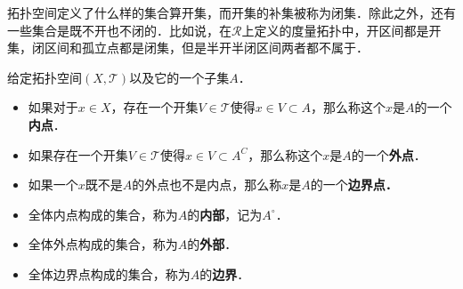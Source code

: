 
拓扑空间定义了什么样的集合算开集，而开集的补集被称为闭集．除此之外，还有一些集合是既不开也不闭的．比如说，在$\mathcal{R}$上定义的度量拓扑中，开区间都是开集，闭区间和孤立点都是闭集，但是半开半闭区间两者都不属于．

\begin{definition}{}
给定拓扑空间$(X, \mathcal{T})$以及它的一个子集$A$．
\begin{itemize}
\item 如果对于$x\in X$，存在一个开集$V\in \mathcal{T}$使得$x\in V\subset A$，那么称这个$x$是$A$的一个\textbf{内点}．
\item 如果存在一个开集$V\in \mathcal{T}$使得$x\in V\subset A^C$，那么称这个$x$是$A$的一个\textbf{外点}．
\item 如果一个$x$既不是$A$的外点也不是内点，那么称$x$是$A$的一个\textbf{边界点．}

\item 全体内点构成的集合，称为$A$的\textbf{内部}，记为$A^\circ$．
\item 全体外点构成的集合，称为$A$的\textbf{外部}．
\item 全体边界点构成的集合，称为$A$的\textbf{边界}．

\end{itemize}
\end{definition}{}
